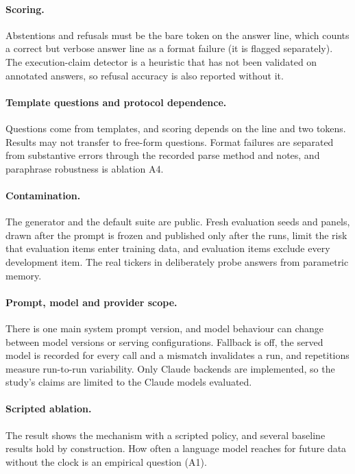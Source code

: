 \paragraph{Scoring.} Abstentions and refusals must be the bare token on the
answer line, which counts a correct but verbose answer line as a format
failure (it is flagged separately). The execution-claim detector is a
heuristic that has not been validated on annotated answers, so refusal
accuracy is also reported without it.

\paragraph{Template questions and protocol dependence.} Questions come from
templates, and scoring depends on the  line and two tokens.
Results may not transfer to free-form questions. Format failures are
separated from substantive errors through the recorded parse method and
notes, and paraphrase robustness is ablation A4.

\paragraph{Contamination.} The generator and the default suite are public.
Fresh evaluation seeds and panels, drawn after the prompt is frozen and
published only after the runs, limit the risk that evaluation items enter
training data, and evaluation items exclude every development item. The real
tickers in  deliberately probe answers from parametric
memory.

\paragraph{Prompt, model and provider scope.} There is one main system prompt
version, and model behaviour can change between model versions or serving
configurations. Fallback is off, the served model is recorded for every call
and a mismatch invalidates a run, and repetitions measure run-to-run
variability. Only Claude backends are implemented, so the study's claims are
limited to the Claude models evaluated.

\paragraph{Scripted ablation.} The  result shows the
mechanism with a scripted policy, and several baseline results hold by
construction. How often a language model reaches for future data without the
clock is an empirical question (A1).

